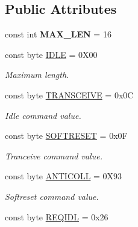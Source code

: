 \subsection*{Public Attributes}
\begin{DoxyCompactItemize}
\item 
const int {\bfseries M\+A\+X\+\_\+\+L\+EN} = 16\hypertarget{classmfrc522_a165ae8f5802c1cb70602248bbe602aa5}{}\label{classmfrc522_a165ae8f5802c1cb70602248bbe602aa5}

\item 
const byte \hyperlink{classmfrc522_a2db7d04e72f02ce2cd1d2f3c2a142d9b}{I\+D\+LE} = 0\+X00\hypertarget{classmfrc522_a2db7d04e72f02ce2cd1d2f3c2a142d9b}{}\label{classmfrc522_a2db7d04e72f02ce2cd1d2f3c2a142d9b}

\begin{DoxyCompactList}\small\item\em Maximum length. \end{DoxyCompactList}\item 
const byte \hyperlink{classmfrc522_a4265ed9beb2068796f558866ecb7d599}{T\+R\+A\+N\+S\+C\+E\+I\+VE} = 0x0C\hypertarget{classmfrc522_a4265ed9beb2068796f558866ecb7d599}{}\label{classmfrc522_a4265ed9beb2068796f558866ecb7d599}

\begin{DoxyCompactList}\small\item\em Idle command value. \end{DoxyCompactList}\item 
const byte \hyperlink{classmfrc522_a5636b5a1e9382e1cc842fa20723d63bb}{S\+O\+F\+T\+R\+E\+S\+ET} = 0x0F\hypertarget{classmfrc522_a5636b5a1e9382e1cc842fa20723d63bb}{}\label{classmfrc522_a5636b5a1e9382e1cc842fa20723d63bb}

\begin{DoxyCompactList}\small\item\em Tranceive command value. \end{DoxyCompactList}\item 
const byte \hyperlink{classmfrc522_a19f4e763eb734d352e9c0bf4694030b1}{A\+N\+T\+I\+C\+O\+LL} = 0\+X93\hypertarget{classmfrc522_a19f4e763eb734d352e9c0bf4694030b1}{}\label{classmfrc522_a19f4e763eb734d352e9c0bf4694030b1}

\begin{DoxyCompactList}\small\item\em Softreset command value. \end{DoxyCompactList}\item 
const byte \hyperlink{classmfrc522_ad0ab76f65c6fff489ac36b763e588e17}{R\+E\+Q\+I\+DL} = 0x26\hypertarget{classmfrc522_ad0ab76f65c6fff489ac36b763e588e17}{}\label{classmfrc522_ad0ab76f65c6fff489ac36b763e588e17}


\end{DoxyCompactItemize}
